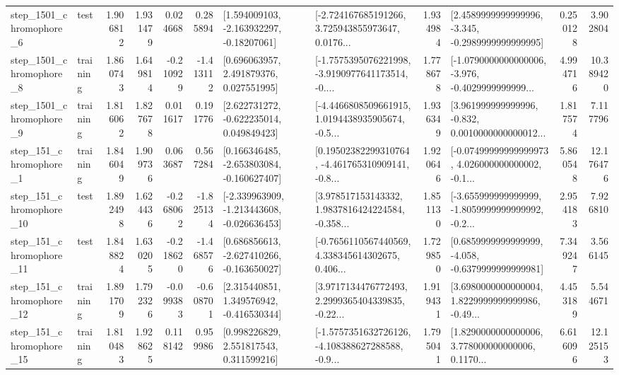 \begin{tabular}{llrrrrllrlrr}
  step\_1501\_chromophore\_6 &      test &      1.906812 &    1.931479 &      0.024668 &  0.285894 &    [1.594009103, -2.163932297, -0.18207061] &  [-2.724167685191266, 3.725943855973647, 0.0176... &       1.934984 &  [2.4589999999999996, -3.345, -0.2989999999999995] &            0.250128 &          3.902804 \\
  step\_1501\_chromophore\_8 &  training &      1.860743 &    1.649814 &     -0.210929 & -1.413112 &     [0.696063957, 2.491879376, 0.027551995] &  [-1.7575395076221998, -3.9190977641173514, -0.... &       1.778678 &  [-1.0790000000000006, -3.976, -0.4029999999999... &            4.994716 &         10.389420 \\
  step\_1501\_chromophore\_9 &  training &      1.816062 &    1.827678 &      0.011617 &  0.191776 &    [2.622731272, -0.622235014, 0.049849423] &  [-4.4466808509661915, 1.0194438935905674, -0.5... &       1.936349 &  [3.961999999999996, -0.832, 0.0010000000000012... &            1.817574 &          7.117796 \\
   step\_151\_chromophore\_1 &  training &      1.846049 &    1.909736 &      0.063687 &  0.567284 &   [0.166346485, -2.653803084, -0.160627407] &  [0.19502382299310764, -4.461765310909141, -0.8... &       1.920646 &  [-0.07499999999999973, 4.026000000000002, -0.1... &            5.860548 &         12.176476 \\
  step\_151\_chromophore\_10 &      test &      1.892498 &    1.624436 &     -0.268062 & -1.825134 &  [-2.339963909, -1.213443608, -0.026636453] &  [3.978517153143332, 1.9837816424224584, -0.358... &       1.851130 &  [-3.655999999999999, -1.8059999999999992, -0.2... &            2.954183 &          7.926810 \\
  step\_151\_chromophore\_11 &      test &      1.848824 &    1.630205 &     -0.218620 & -1.468576 &   [0.686856613, -2.627410266, -0.163650027] &  [-0.7656110567440569, 4.338345614302675, 0.406... &       1.729850 &  [0.6859999999999999, -4.058, -0.6379999999999981] &            7.349247 &          3.566145 \\
  step\_151\_chromophore\_12 &  training &      1.891709 &    1.792326 &     -0.099383 & -0.608701 &    [2.315440851, 1.349576942, -0.416530344] &  [3.9717134476772493, 2.2999365404339835, -0.22... &       1.919431 &  [3.6980000000000004, 1.8229999999999986, -0.49... &            4.453189 &          5.544671 \\
  step\_151\_chromophore\_15 &  training &      1.810483 &    1.928625 &      0.118142 &  0.959986 &     [0.998226829, 2.551817543, 0.311599216] &  [-1.5757351632726126, -4.108388627288588, -0.9... &       1.795041 &  [1.8290000000000006, 3.778000000000006, 0.1170... &            6.616096 &         12.125153 \\

\end{tabular}
